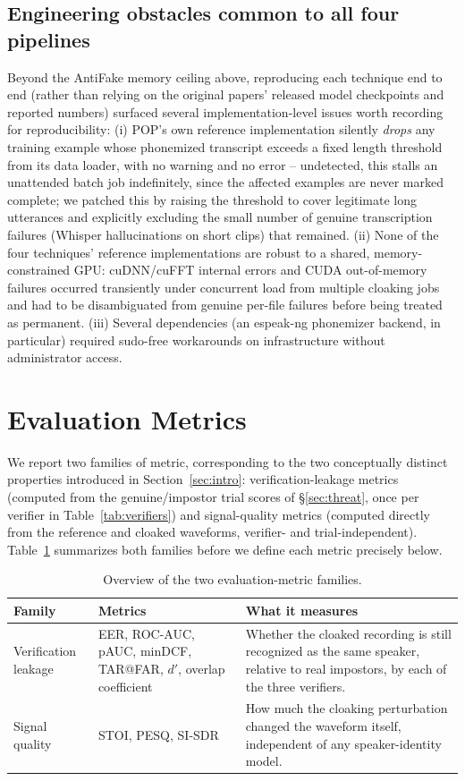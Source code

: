 \documentclass[11pt]{article}
\begin{document}
\subsection{Engineering obstacles common to all four pipelines}
Beyond the AntiFake memory ceiling above, reproducing each technique
end to end (rather than relying on the original papers' released
model checkpoints and reported numbers) surfaced several
implementation-level issues worth recording for reproducibility:
(i) POP's own reference implementation silently \emph{drops} any
training example whose phonemized transcript exceeds a fixed length
threshold from its data loader, with no warning and no error --
undetected, this stalls an unattended batch job indefinitely, since
the affected examples are never marked complete; we patched this by
raising the threshold to cover legitimate long utterances and
explicitly excluding the small number of genuine transcription
failures (Whisper hallucinations on short clips) that remained.
(ii) None of the four techniques' reference implementations are
robust to a shared, memory-constrained GPU: cuDNN/cuFFT internal
errors and CUDA out-of-memory failures occurred transiently under
concurrent load from multiple cloaking jobs and had to be
disambiguated from genuine per-file failures before being treated as
permanent. (iii) Several dependencies (an espeak-ng phonemizer
backend, in particular) required sudo-free workarounds on
infrastructure without administrator access.

\section{Evaluation Metrics}
\label{sec:metrics}

We report two families of metric, corresponding to the two
conceptually distinct properties introduced in
Section~\ref{sec:intro}: verification-leakage metrics (computed from
the genuine/impostor trial scores of \S\ref{sec:threat}, once per
verifier in Table~\ref{tab:verifiers}) and signal-quality metrics
(computed directly from the reference and cloaked waveforms, verifier-
and trial-independent). Table~\ref{tab:metrics-overview} summarizes
both families before we define each metric precisely below.

\begin{table}[H]
\centering
\caption{Overview of the two evaluation-metric families.}
\label{tab:metrics-overview}
\begin{tabular}{p{2.6cm}p{4.6cm}p{5.8cm}}
\toprule
Family & Metrics & What it measures \\
\midrule
Verification leakage & EER, ROC-AUC, pAUC, minDCF, TAR@FAR, $d'$, overlap coefficient
  & Whether the cloaked recording is still recognized as the same speaker,
    relative to real impostors, by each of the three verifiers. \\
Signal quality & STOI, PESQ, SI-SDR
  & How much the cloaking perturbation changed the waveform itself,
    independent of any speaker-identity model. \\
\bottomrule
\end{tabular}
\end{table}
\end{document}
